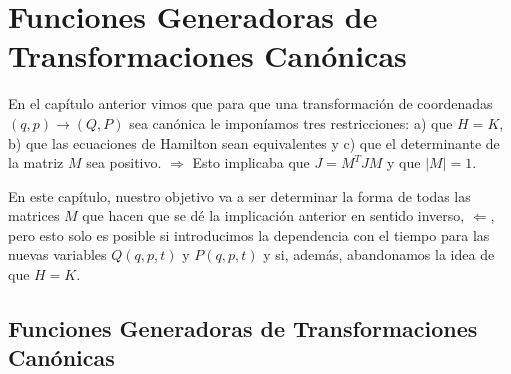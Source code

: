 \chapter{Funciones Generadoras de Transformaciones Canónicas}
\label{T19FG}

\vspace{10mm}
\begin{adjustwidth}{50pt}{50pt}
\begin{ejemplo}

En el capítulo anterior vimos que para que una transformación de coordenadas $(q,p)\to (Q,P)$ sea canónica le imponíamos tres restricciones: a) que $H=K$, b) que las ecuaciones de Hamilton sean equivalentes y c) que el determinante de la matriz $M$ sea positivo. $\boldsymbol{\Rightarrow}$ Esto implicaba que $J=M^TJM$ y que $|M|=1$.

En este capítulo, nuestro objetivo va a ser determinar la forma de todas las matrices $M$ que hacen que se dé la implicación anterior en sentido inverso, $\boldsymbol{\Leftarrow}$, pero esto solo es posible si introducimos la dependencia con el tiempo para las nuevas variables $Q(q,p,t) \text{ y } P(q,p,t)$ y si, además, abandonamos la idea de que $H=K$.

\end{ejemplo}
\end{adjustwidth}
\vspace{5mm}
\section{Funciones Generadoras de Transformaciones Canónicas}
\vspace{5mm}



